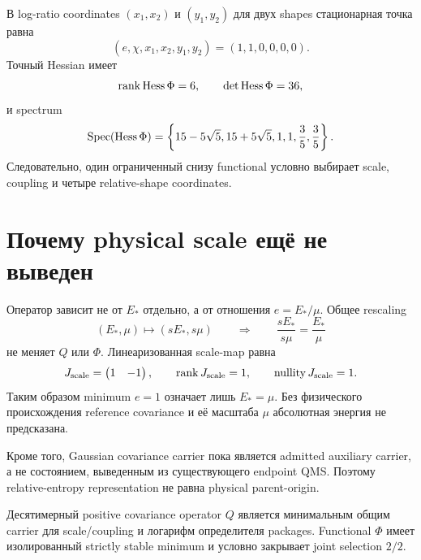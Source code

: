 В log-ratio coordinates $(x_1,x_2)$ и $(y_1,y_2)$ для двух shapes
стационарная точка равна
\begin{equation}
 (e,\chi,x_1,x_2,y_1,y_2)=(1,1,0,0,0,0).
 \label{eq:v9-common-origin-stationary-point}
\end{equation}
Точный Hessian имеет
\begin{equation}
 \operatorname{rank}\operatorname{Hess}\Phi=6,
 \qquad \det\operatorname{Hess}\Phi=36,
 \label{eq:v9-common-origin-hessian-rank}
\end{equation}
и spectrum
\begin{equation}
 \operatorname{Spec}(\operatorname{Hess}\Phi)=
 \left\{15-5\sqrt5,15+5\sqrt5,1,1,\frac35,\frac35\right\}.
 \label{eq:v9-common-origin-hessian-spectrum}
\end{equation}
Следовательно, один ограниченный снизу functional условно выбирает scale,
coupling и четыре relative-shape coordinates.

\section{Почему physical scale ещё не выведен}

Оператор зависит не от $E_*$ отдельно, а от отношения $e=E_*/\mu$.
Общее rescaling
\begin{equation}
 (E_*,\mu)\longmapsto(sE_*,s\mu)
 \qquad\Longrightarrow\qquad
 \frac{sE_*}{s\mu}=\frac{E_*}{\mu}
 \label{eq:v9-common-origin-scale-orbit}
\end{equation}
не меняет $Q$ или $\Phi$. Линеаризованная scale-map равна
\begin{equation}
 J_{\rm scale}=\begin{pmatrix}1&-1\end{pmatrix},
 \qquad \operatorname{rank} J_{\rm scale}=1,
 \qquad \operatorname{nullity}J_{\rm scale}=1.
 \label{eq:v9-common-origin-scale-nullity}
\end{equation}
Таким образом minimum $e=1$ означает лишь $E_*=\mu$. Без физического
происхождения reference covariance и её масштаба $\mu$ абсолютная энергия
не предсказана.

Кроме того, Gaussian covariance carrier пока является admitted auxiliary
carrier, а не состоянием, выведенным из существующего endpoint QMS. Поэтому
relative-entropy representation не равна physical parent-origin.

\begin{theorem}
Десятимерный positive covariance operator $Q$ является минимальным общим
carrier для scale/coupling и логарифм определителя packages. Functional $\Phi$ имеет
изолированный strictly stable minimum и условно закрывает joint selection
$2/2$.
\end{theorem}


